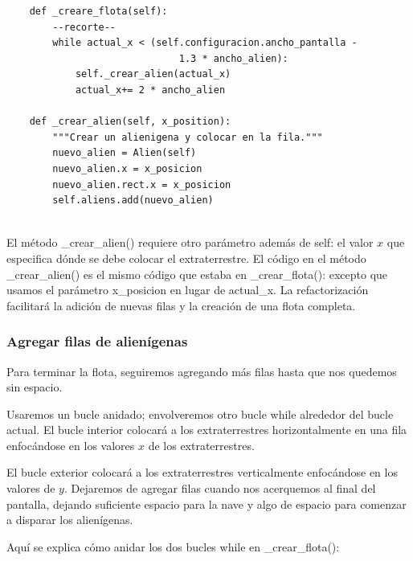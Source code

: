 \hspace{-2.4cm}{\ttfamily \scriptsize invasión}

\vspace{-0.2cm}
\hspace{-2.1cm}{\ttfamily \scriptsize \_alien.py}\vspace{-0.84cm}
\begin{lstlisting}
    def _creare_flota(self): 
        --recorte--
        while actual_x < (self.configuracion.ancho_pantalla - 
                              1.3 * ancho_alien):
            self._crear_alien(actual_x)
            actual_x+= 2 * ancho_alien
            
    def _crear_alien(self, x_position):
        """Crear un alienigena y colocar en la fila."""
        nuevo_alien = Alien(self)
        nuevo_alien.x = x_posicion
        nuevo_alien.rect.x = x_posicion
        self.aliens.add(nuevo_alien)
	
\end{lstlisting}

El método {\ttfamily \_crear\_alien()} requiere otro parámetro además de {\ttfamily self}: el valor $x$ que especifica dónde se 
debe colocar el extraterrestre. El código en el método {\ttfamily \_crear\_alien()}  es el mismo código que estaba 
en  {\ttfamily\_crear\_flota()}: excepto que usamos el parámetro  {\ttfamily x\_posicion} en lugar de  
{\ttfamily actual\_x}. La refactorización facilitará la adición de nuevas filas y la creación de una flota completa.

\subsubsection{Agregar filas de alienígenas}

Para terminar la flota, seguiremos agregando más filas hasta que nos quedemos sin espacio.

Usaremos un bucle anidado; envolveremos otro bucle  {\ttfamily while} alrededor del bucle actual.
El bucle interior colocará a los extraterrestres horizontalmente en una fila enfocándose en
los valores $x$ de los extraterrestres. 

El bucle exterior colocará a los extraterrestres verticalmente enfocándose en los valores de $y$. 
Dejaremos de agregar filas cuando nos acerquemos al final del pantalla, dejando suficiente espacio para la nave y algo de espacio para comenzar a disparar los alienígenas.

Aquí se explica cómo anidar los dos bucles while en  {\ttfamily\_crear\_flota()}:



